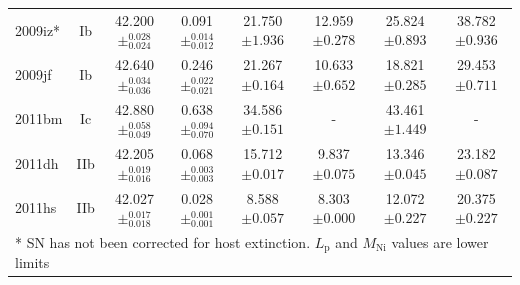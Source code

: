 \documentclass[a4paper,fleqn,usenatbib]{mnras}
\begin{document}
\begin{table}
\begin{minipage}{160mm}
\begin{tabular}{lccccccc}
2009iz* & Ib & 42.200$\pm^{0.028}_{0.024}$ & 0.091$\pm^{0.014}_{0.012}$ & 21.750$\pm{1.936}$ & 12.959$\pm 0.278$ & 25.824$\pm 0.893$ & 38.782$\pm 0.936$\\
2009jf & Ib & 42.640$\pm^{0.034}_{0.036}$ & 0.246$\pm^{0.022}_{0.021}$ & 21.267$\pm{0.164}$ & 10.633$\pm 0.652$ & 18.821$\pm 0.285$ & 29.453$\pm 0.711$\\
2011bm & Ic & 42.880$\pm^{0.058}_{0.049}$ & 0.638$\pm^{0.094}_{0.070}$ & 34.586$\pm{0.151}$ & - & 43.461$\pm 1.449$ & -\\
2011dh & IIb & 42.205$\pm^{0.019}_{0.016}$ & 0.068$\pm^{0.003}_{0.003}$ & 15.712$\pm{0.017}$ & 9.837$\pm 0.075$ & 13.346$\pm 0.045$ & 23.182$\pm 0.087$\\
2011hs & IIb & 42.027$\pm^{0.017}_{0.018}$ & 0.028$\pm^{0.001}_{0.001}$ & 8.588$\pm{0.057}$ & 8.303$\pm 0.000$ & 12.072$\pm 0.227$ & 20.375$\pm 0.227$\\
\hline
\multicolumn{8}{p{\textwidth}}{* SN has not been corrected for host extinction. $L_{\mathrm{p}}$ and $M_{\mathrm{Ni}}$ values are lower limits}
 \label{intONIRstats}
\end{tabular}
\end{minipage}
\end{table}
\end{document}
